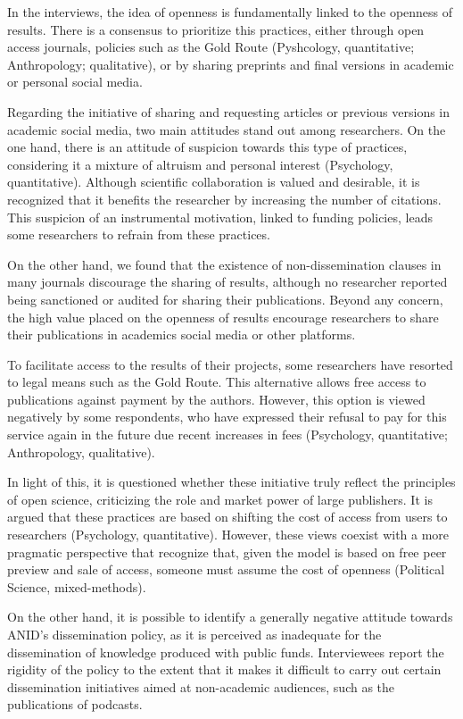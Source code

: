 \documentclass[
  letterpaper,
]{article}
\begin{document}
In the interviews, the idea of openness is fundamentally linked to the
openness of results. There is a consensus to prioritize this practices,
either through open access journals, policies such as the Gold Route
(Pyshcology, quantitative; Anthropology; qualitative), or by sharing
preprints and final versions in academic or personal social media.

Regarding the initiative of sharing and requesting articles or previous
versions in academic social media, two main attitudes stand out among
researchers. On the one hand, there is an attitude of suspicion towards
this type of practices, considering it a mixture of altruism and
personal interest (Psychology, quantitative). Although scientific
collaboration is valued and desirable, it is recognized that it benefits
the researcher by increasing the number of citations. This suspicion of
an instrumental motivation, linked to funding policies, leads some
researchers to refrain from these practices.

On the other hand, we found that the existence of non-dissemination
clauses in many journals discourage the sharing of results, although no
researcher reported being sanctioned or audited for sharing their
publications. Beyond any concern, the high value placed on the openness
of results encourage researchers to share their publications in
academics social media or other platforms.

To facilitate access to the results of their projects, some researchers
have resorted to legal means such as the Gold Route. This alternative
allows free access to publications against payment by the authors.
However, this option is viewed negatively by some respondents, who have
expressed their refusal to pay for this service again in the future due
recent increases in fees (Psychology, quantitative; Anthropology,
qualitative).

In light of this, it is questioned whether these initiative truly
reflect the principles of open science, criticizing the role and market
power of large publishers. It is argued that these practices are based
on shifting the cost of access from users to researchers (Psychology,
quantitative). However, these views coexist with a more pragmatic
perspective that recognize that, given the model is based on free peer
preview and sale of access, someone must assume the cost of openness
(Political Science, mixed-methods).

On the other hand, it is possible to identify a generally negative
attitude towards ANID's dissemination policy, as it is perceived as
inadequate for the dissemination of knowledge produced with public
funds. Interviewees report the rigidity of the policy to the extent that
it makes it difficult to carry out certain dissemination initiatives
aimed at non-academic audiences, such as the publications of podcasts.
\end{document}
